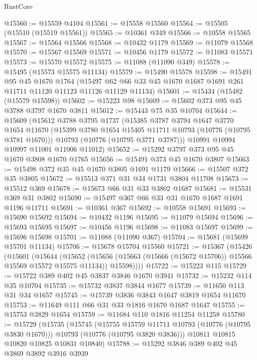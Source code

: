 \begin{lexlean}{RustCore}
\begin{coremodule}
@15560 := @15559 @4104
@15561 := @15558 @15560
@15564 := @15505 (@15510 (@15519 @15561))
@15565 := @10361 @349
@15566 := @10558 @15565
@15567 := @15564 @15566
@15568 := @10432 @1179
@15569 := @11079 @15568
@15570 := @15567 @15569
@15571 := @10456 @1179
@15572 := @11083 @15571
@15573 := @15570 @15572
@15575 := @11088 (@11090 @349)
@15578 := @15495 (@15573 @15575 @11134)
@15579 := @15490 @15578
@15598 := @15491
    @95
    @45
    @1670
    @1764
    (@15497 @62 @66 @33 @45 @1670 @1687 @1691 @261 @11711 @11120 @11123 @11126 @11129 @11134)
@15601 := @15434 (@15482 (@15579 @15598))
@15602 := @15223 @98
@15609 := @15602 @373 @95 @45 @3788 @3797 @1670 @3811
@15612 := @15443 @75 @35 @10704
@15644 := @15609
    (@15612
      @3788
      @3795
      @1737
      (@15385
        @3787
        @3794
        @1647
        @3770
        @1654
        @11670
        (@15399 @3780 @1654 @15405 @11711 @10793 (@10776 (@10795 @3781 @1670)))
        @10793
        (@10776 (@10795 @3771 @3787)))
      @10991
      @10994
      @10997
      @11001
      @11006
      @11012)
@15652 := @15292 @3797 @373 @95 @45 @1670 @3808 @1670 @1765
@15656 := @15491 @373 @45 @1670 @3807
@15663 := @15498 @372 @35 @45 @1670 @3805 @1691 @1179
@15666 := @15507 @372 @35 @3805
@15672 := @15513 @371 @31 @34 @1731 @3804 @11708
@15673 := @15512 @369
@15678 := @15673 @66 @31 @33 @3802 @1687
@15681 := @15531 @369 @31 @3802
@15690 := @15497 @367 @66 @33 @31 @1670 @1687 @1691 @1196 @11711
@15691 := @10361 @367
@15692 := @10558 @15691
@15693 := @15690 @15692
@15694 := @10432 @1196
@15695 := @11079 @15694
@15696 := @15693 @15695
@15697 := @10456 @1196
@15698 := @11083 @15697
@15699 := @15696 @15698
@15701 := @11088 (@11090 @367)
@15704 := @15681 (@15699 @15701 @11134)
@15706 := @15678 @15704 @15560
@15721 := @15367
    (@15426
      (@15601
        (@15644
          (@15652
            (@15656 (@15663 (@15666 (@15672 @15706)) @15566 @15569 @15572 @15575 @11134))
            @15598))))
@15722 := @15223 @115
@15729 := @15722 @389 @402 @45 @3837 @3846 @1670 @3941
@15732 := @15232 @114 @35 @10704
@15735 := @15732 @3837 @3844 @1677
@15739 := @11650 @113 @31 @34 @1657
@15745 := @15739 @3836 @3843 @1647 @3819 @1654 @11670
@15753 := @11649 @111 @66 @31 @33 @1816 @1670 @1687 @1647
@15755 := @15753 @3829 @1654
@15759 := @11684 @110 @1816 @11254 @11258
@15780 := @15729
    (@15735
      (@15745
        (@15755 @15759 @11711 @10793 (@10776 (@10795 @3830 @1670)))
        @10793
        (@10776 (@10795 @3820 @3836)))
      @10811
      @10815
      @10820
      @10825
      @10831
      @10840)
@15788 := @15292 @3846 @389 @402 @45 @3869 @3892 @3916 @3939

\end{coremodule}
\end{lexlean}
